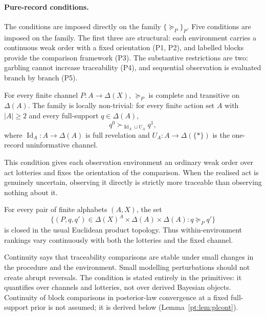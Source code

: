 \documentclass[11pt,a4paper]{article}
\theoremstyle{definition}
\newcommand{\Id}{\operatorname{Id}}
\newcommand{\1}{\mathbf 1}
\begin{document}
\paragraph{Pure-record conditions.}
The conditions are imposed directly on the family $\{\succeq_P\}_P$.  
Five conditions are imposed on the family. The first three are structural:
      each environment carries a continuous weak order with a fixed orientation
      (P1, P2), and labelled blocks provide the comparison framework (P3).
      The substantive restrictions are two: garbling cannot increase
      traceability (P4), and sequential observation is evaluated branch by
      branch (P5).


\begin{description}[leftmargin=*,style=sameline]

\item[(P1) Weak order and local non-triviality.]
For every finite channel $P:A\to\Delta(X)$, $\succeq_P$ is complete and transitive on $\Delta(A)$.  The family is
locally non-trivial: for every finite action set $A$ with $|A|\ge 2$ and every full-support $q\in\Delta(A)$,
\[
q^0\succ_{\Id_A\sqcup U_A}q^1,
\]
where $\Id_A:A\to\Delta(A)$ is full revelation and $U_A:A\to\Delta(\{\ast\})$ is the one-record uninformative channel.

This condition gives each observation environment an ordinary weak order over act lotteries and fixes the orientation of the
comparison.  When the realised act is genuinely uncertain, observing it directly is strictly more traceable than observing
nothing about it.

\item[(P2) Continuity.]
For every pair of finite alphabets $(A,X)$, the set
\[
\{(P,q,q')\in \Delta(X)^A\times\Delta(A)\times\Delta(A):q\succeq_P q'\}
\]
is closed in the usual Euclidean product topology.  Thus within-environment rankings vary continuously with both the
lotteries and the fixed channel.

Continuity says that traceability comparisons are stable under small changes in the procedure and the environment.  Small
modelling perturbations should not create abrupt reversals.  The condition is stated entirely in the primitives: it quantifies
over channels and lotteries, not over derived Bayesian objects.  Continuity of block comparisons in posterior-law
convergence at a fixed full-support prior is not assumed; it is derived below
(Lemma~\ref{pt:lem:plcont}).


\end{description}
\end{document}
